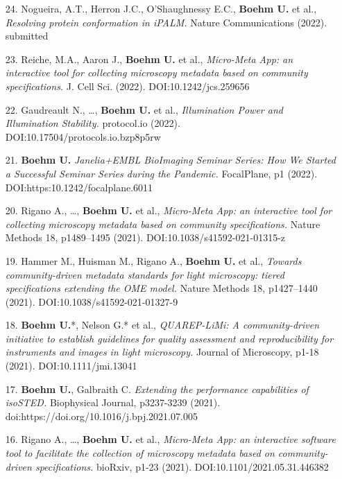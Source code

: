 \documentclass[margin,line]{res}
\begin{document}
\begin{resume}
\begin{enumerate}[leftmargin=*]
\item[24.] Nogueira, A.T., Herron J.C., O’Shaughnessy E.C., {\bf Boehm U.} et al., {\it Resolving protein conformation in iPALM.} Nature Communications (2022). submitted

\item[23.] Reiche, M.A., Aaron J., {\bf Boehm U.} et al., {\it Micro-Meta App: an interactive tool for collecting microscopy metadata based on community specifications.} J. Cell Sci. (2022). DOI:10.1242/jcs.259656

\item[22.] Gaudreault N., \dots, {\bf Boehm U.} et al., {\it Illumination Power and Illumination Stability.} protocol.io (2022). DOI:10.17504/protocols.io.bzp8p5rw

\item[21.] {\bf Boehm U.} {\it Janelia+EMBL BioImaging Seminar Series: How We Started a Successful Seminar Series during the Pandemic.} FocalPlane, p1 (2022). DOI:https:10.1242/focalplane.6011

\item[20.] Rigano A., \dots, {\bf Boehm U.} et al., {\it Micro-Meta App: an interactive tool for collecting microscopy metadata based on community specifications.} Nature Methods 18, p1489–1495 (2021). DOI:10.1038/s41592-021-01315-z

\item[19.] Hammer M., Huisman M., Rigano A., {\bf Boehm U.} et al., {\it Towards community-driven metadata standards for light microscopy: tiered specifications extending the OME model.} Nature Methods 18, p1427–1440 (2021). DOI:10.1038/s41592-021-01327-9

\item[18.] {\bf Boehm U.}*, Nelson G.* et al., {\it QUAREP-LiMi: A community-driven initiative to establish guidelines for quality assessment and reproducibility for instruments and images in light microscopy.} Journal of Microscopy, p1-18 (2021). DOI:10.1111/jmi.13041

\item[17.] {\bf Boehm U.}, Galbraith C. {\it Extending the performance capabilities of isoSTED.} Biophysical Journal, p3237-3239 (2021). doi:https://doi.org/10.1016/j.bpj.2021.07.005

\item[16.] Rigano A., \dots, {\bf Boehm U.} et al., {\it Micro-Meta App: an interactive software tool to facilitate the collection of microscopy metadata based on community-driven specifications.} bioRxiv, p1-23 (2021). DOI:10.1101/2021.05.31.446382


\end{enumerate}
\end{resume}
\end{document}
